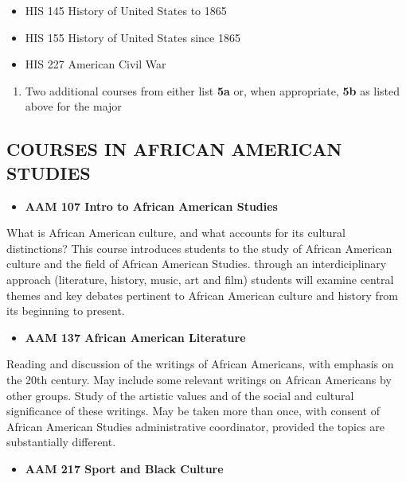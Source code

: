 \documentclass[
  letterpaper,
]{scrbook}
\providecommand{\tightlist}{%
  \setlength{\itemsep}{0pt}\setlength{\parskip}{0pt}}
\begin{document}
\begin{itemize}
\tightlist
\item
  HIS 145 History of United States to 1865
\item
  HIS 155 History of United States since 1865
\item
  HIS 227 American Civil War
\end{itemize}

\begin{enumerate}
\def\labelenumi{\arabic{enumi}.}
\setcounter{enumi}{4}
\tightlist
\item
  Two additional courses from either list \textbf{5a} or, when
  appropriate, \textbf{5b} as listed above for the major
\end{enumerate}

\subsection{COURSES IN AFRICAN AMERICAN
STUDIES}\label{courses-in-african-american-studies}

\begin{itemize}
\tightlist
\item
  \textbf{AAM 107 Intro to African American Studies}
\end{itemize}

What is African American culture, and what accounts for its cultural
distinctions? This course introduces students to the study of African
American culture and the field of African American Studies. through an
interdiciplinary approach (literature, history, music, art and film)
students will examine central themes and key debates pertinent to
African American culture and history from its beginning to present.

\begin{itemize}
\tightlist
\item
  \textbf{AAM 137 African American Literature}
\end{itemize}

Reading and discussion of the writings of African Americans, with
emphasis on the 20th century. May include some relevant writings on
African Americans by other groups. Study of the artistic values and of
the social and cultural significance of these writings. May be taken
more than once, with consent of African American Studies administrative
coordinator, provided the topics are substantially different.

\begin{itemize}
\tightlist
\item
  \textbf{AAM 217 Sport and Black Culture}
\end{itemize}
\end{document}

